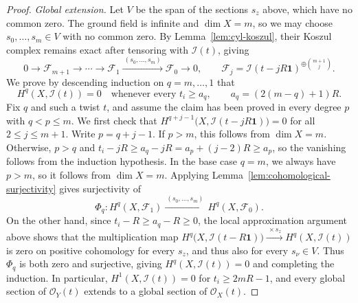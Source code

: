 \documentclass[11pt,letterpaper]{article}
\renewcommand{\le}{\leqslant}
\renewcommand{\ge}{\geqslant}
\theoremstyle{definition}
\theoremstyle{remark}
\begin{document}
\begin{proof}
\emph{Global extension.}
Let $V$ be the span of the sections $s_z$ above,
which have no common zero. The ground field is infinite and
$\dim X=m$, so we may choose $s_0,\ldots,s_m\in V$ with no
common zero. By Lemma~\ref{lem:cyl-koszul}, their Koszul complex remains
exact after tensoring with $\mathcal I(t)$, giving
\[
0\longrightarrow \mathcal F_{m+1}
\longrightarrow\cdots
\longrightarrow\mathcal F_1
\xrightarrow{\ (s_0,\ldots,s_m)\ }
\mathcal F_0
\longrightarrow0,
\qquad
\mathcal F_j
=
\mathcal I(t-jR\mathbf1)^{\oplus\binom{m+1}{j}}.
\]
We prove by descending induction on $q=m,\ldots,1$ that
\[
H^q(X,\mathcal I(t))=0
\quad\text{whenever every }t_i\ge a_q,
\qquad
a_q=(2(m-q)+1)R.
\]
Fix $q$ and such a twist $t$, and assume the claim has
been proved in every degree $p$ with $q<p\le m$.
We first check that
$H^{q+j-1}\bigl(X,\mathcal I(t-jR\mathbf1)\bigr)=0$ for all $2\le j\le m+1$.
Write $p=q+j-1$. If $p>m$, this follows from $\dim X=m$. Otherwise, $p>q$ and $t_i-jR
\ge a_q-jR
= a_p+(j-2)R
\ge a_p$, 
so the vanishing follows from the induction hypothesis. In the base case $q=m$, we always have $p>m$, so it follows from $\dim X=m$.
Applying Lemma~\ref{lem:cohomological-surjectivity} gives
surjectivity of
\[
\Phi_q:
H^q(X,\mathcal F_1)
\xrightarrow{\ (s_0,\ldots,s_m)\ }
H^q(X,\mathcal F_0).
\]
On the other hand, since $t_i-R\ge a_q-R\ge0$, the local approximation argument above shows that the multiplication map
$H^q\bigl(X,\mathcal I(t-R\mathbf1)\bigr)
\xrightarrow{\ \times s_z\ }
H^q(X,\mathcal I(t))$ is zero on positive cohomology for every $s_z$, and thus also for every $s_\nu\in V$. Thus $\Phi_q$ is both zero and
surjective, giving $H^q(X,\mathcal I(t))=0$ and completing the induction. 
In particular, \(H^1(X,\mathcal I(t))=0\) for \(t_i\ge 2mR-1\), and every global section of \(\mathcal O_Y(t)\) extends to a global section of \(\mathcal O_X(t)\).


\end{proof}
\end{document}

